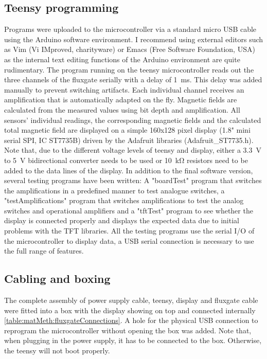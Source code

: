         \subsection{Teensy programming}
        Programs were uploaded to the microcontroller via a standard micro USB cable using the Arduino software environment. I recommend using external editors such as Vim (Vi IMproved, charityware) or Emacs (Free Software Foundation, USA) as the internal text editing functions of the Arduino environment are quite rudimentary. The program running on the teensy microcontroller reads out the three channels of the fluxgate serially with a delay of \SI{1}{\milli\second}. This delay was added manually to prevent switching artifacts. Each individual channel receives an amplification that is automatically adapted on the fly. Magnetic fields are calculated from the measured values using bit depth and amplification. All sensors' individual readings, the corresponding magnetic fields and the calculated total magnetic field are displayed on a simple 160x128 pixel display (1.8" mini serial SPI, IC ST7735B) driven by the Adafruit libraries (Adafruit\_ST7735.h). Note that, due to the different voltage levels of teensy and display, either a \SI{3.3}{\volt} to \SI{5}{\volt} bidirectional converter needs to be used or \SI{10}{\kilo\ohm} resistors need to be added to the data lines of the display. In addition to the final software version, several testing programs have been written: A "boardTest" program that switches the amplifications in a predefined manner to test analogue switches, a "testAmplifications" program that switches amplifications to test the analog switches and operational amplifiers and a "tftTest" program to see whether the display is connected properly and displays the expected data due to initial problems with the TFT libraries. All the testing programs use the serial I/O of the microcontroller to display data, a USB serial connection is necessary to use the full range of features.
        \subsection{Cabling and boxing}
        The complete assembly of power supply cable, teensy, display and fluxgate cable were fitted into a box with the display showing on top and connected internally \ref{table:matMeth:fluxgateConnections}. A hole for the physical USB connection to reprogram the microcontroller without opening the box was added. Note that, when plugging in the power supply, it has to be connected to the box. Otherwise, the teensy will not boot properly.
